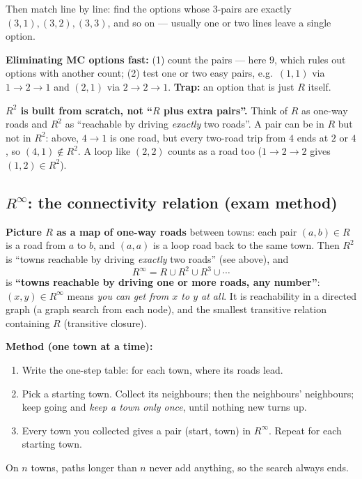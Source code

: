 \documentclass{fkt-notes}
\theoremstyle{definition}
\begin{document}
Then match line by line: find the options whose $3$-pairs are exactly
$(3,1), (3,2), (3,3)$, and so on --- usually one or two lines leave a
single option.

\noindent \textbf{Eliminating MC options fast:} (1) count the pairs ---
here $9$, which rules out options with another count; (2) test one or
two easy pairs, e.g.\ $(1,1)$ via $1 \to 2 \to 1$ and $(2,1)$ via
$2 \to 2 \to 1$. \textbf{Trap:} an option that is just $R$ itself.

\noindent \textbf{$R^2$ is built from scratch, not ``$R$ plus extra
  pairs''.} Think of $R$ as one-way roads and $R^2$ as ``reachable by
driving \emph{exactly} two roads''. A pair can be in $R$ but not in
$R^2$: above, $4 \to 1$ is one road, but every two-road trip from $4$
ends at $2$ or $4$, so $(4, 1) \notin R^2$. A loop like $(2, 2)$ counts
as a road too ($1 \to 2 \to 2$ gives $(1, 2) \in R^2$).

\subsection{\texorpdfstring{$R^\infty$}{R-infinity}: the connectivity relation (exam method)}
%
\textbf{Picture $R$ as a map of one-way roads} between towns: each pair
$(a,b)\in R$ is a road from $a$ to $b$, and $(a,a)$ is a loop road back
to the same town. Then $R^2$ is ``towns reachable by driving
\emph{exactly} two roads'' (see above), and
\[
  R^\infty = R \cup R^2 \cup R^3 \cup \cdots
\]
is \textbf{``towns reachable by driving one or more roads, any number''}:
$(x,y)\in R^\infty$ means \emph{you can get from $x$ to $y$ at all}. It
is reachability in a directed graph (a graph search from each node), and
the smallest transitive relation containing $R$ (transitive closure).

\begin{rulepar}
  \textbf{Method (one town at a time):}
  \begin{enumerate}[label=\arabic*.,nosep]
    \item Write the one-step table: for each town, where its roads lead.
    \item Pick a starting town. Collect its neighbours; then the
          neighbours' neighbours; keep going and \emph{keep a town only
            once}, until nothing new turns up.
    \item Every town you collected gives a pair (start, town) in
          $R^\infty$. Repeat for each starting town.
  \end{enumerate}
  On $n$ towns, paths longer than $n$ never add anything, so the search
  always ends.
\end{rulepar}
\end{document}
